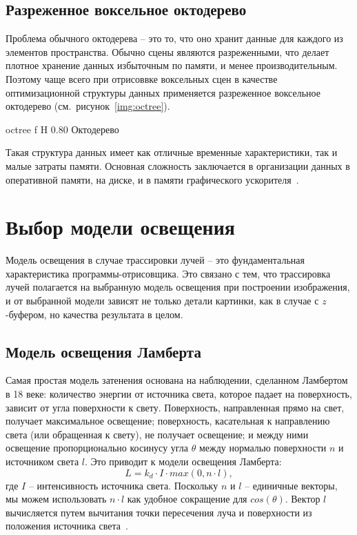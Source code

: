 \subsection{Разреженное воксельное октодерево}

Проблема обычного октодерева -- это то, что оно хранит данные для каждого из элементов 
пространства. Обычно сцены являются разреженными, что делает плотное хранение данных
избыточным по памяти, и менее производительным. Поэтому чаще всего при отрисоввке
воксельных сцен в качестве оптимизационной структуры данных применяется разреженное воксельное
октодерево (см.~рисунок~\ref{img:octree}).

    {octree}
    {f}
    {H}
    {0.80\textwidth}
    {Октодерево~\cite{Octree}}

Такая структура данных имеет как отличные временные характеристики, так и малые затраты памяти.
Основная сложность заключается в организации данных в оперативной памяти, на диске, 
и в памяти графического ускорителя~\cite{ESVOAEaI}.

\section{Выбор модели освещения}

Модель освещения в случае трассировки лучей -- это фундаментальная характеристика программы-отрисовщика. Это связано с тем, что трассировка лучей полагается на выбранную модель освещения
при построении изображения, и от выбранной модели зависят не только детали картинки, как в случае с $z$-буфером, но качества результата в целом.

\subsection{Модель освещения Ламберта}
Самая простая модель затенения основана на наблюдении, сделанном Ламбертом в 18 веке: 
количество энергии от источника света, которое падает на поверхность, зависит от угла 
поверхности к свету. Поверхность, направленная прямо на свет, получает максимальное 
освещение; поверхность, касательная к направлению света (или обращенная к свету), 
не получает освещение; и между ними освещение пропорционально косинусу угла $\theta$
между нормалью поверхности $n$ и источником света $l$. Это приводит к 
модели освещения Ламберта:
\begin{equation}
L = k_d \cdot I \cdot max(0, n \cdot l),
\end{equation}
где $I$ -- интенсивность источника света. Поскольку $n$ и $l$ -- единичные векторы, мы можем использовать $n \cdot l$ как удобное сокращение для $cos(\theta)$. 
Вектор $l$ вычисляется путем вычитания точки пересечения луча и поверхности из положения 
источника света~\cite{FoCG}.


